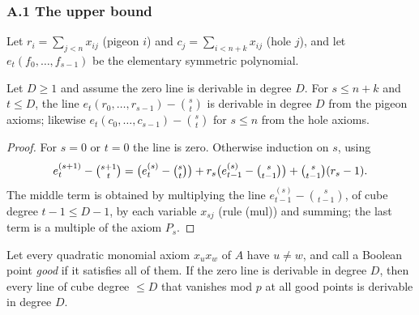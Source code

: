\subsubsection*{A.1 The upper bound}

Let $r_i=\sum_{j<n}x_{ij}$ (pigeon $i$) and $c_j=\sum_{i<n+k}x_{ij}$ (hole $j$),
and let $e_t(f_0,\dots,f_{s-1})$ be the elementary symmetric polynomial.

\begin{lemma}\label{lem:esym}
Let $D\ge1$ and assume the zero line is derivable in degree $D$.  For $s\le n+k$ and $t\le D$, the line
$e_t(r_0,\dots,r_{s-1})-\binom st$ is derivable in degree $D$ from the pigeon axioms;
likewise $e_t(c_0,\dots,c_{s-1})-\binom st$ for $s\le n$ from the hole
axioms.
\end{lemma}

\begin{proof}
For $s=0$ or $t=0$ the line is zero.  Otherwise induction on $s$, using
\[
e^{(s+1)}_t-\tbinom{s+1}t=\bigl(e^{(s)}_t-\tbinom st\bigr)
+r_s\bigl(e^{(s)}_{t-1}-\tbinom s{t-1}\bigr)+\tbinom s{t-1}(r_s-1).
\]
The middle term is obtained by multiplying the line
$e^{(s)}_{t-1}-\binom s{t-1}$, of cube degree $t-1\le D-1$, by each variable
$x_{sj}$ (rule (mul)) and summing; the last term is a multiple of the axiom
$P_s$.
\end{proof}

\begin{lemma}\label{lem:quot}
Let every quadratic monomial axiom $x_ux_w$ of $A$ have $u\ne w$, and call a Boolean
point \emph{good} if it satisfies all of them.  If the zero line is derivable in
degree $D$, then every line of cube degree $\le D$ that vanishes mod $p$ at all good
points is derivable in degree $D$.
\end{lemma}

